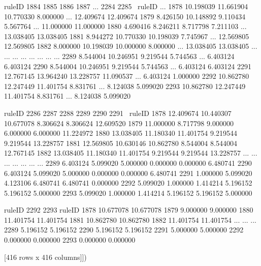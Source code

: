 ruleID       1884       1885       1886       1887  ...       2284       2285  \
ruleID                                              ...                         
1878    10.198039  11.661904  10.770330   8.000000  ...  12.409674  12.409674   
1879     8.426150  10.148892   9.110434   5.567764  ...  11.000000  11.000000   
1880     4.690416   8.246211   8.717798   7.211103  ...  13.038405  13.038405   
1881     8.944272  10.770330  10.198039   7.745967  ...  12.569805  12.569805   
1882     8.000000  10.198039  10.000000   8.000000  ...  13.038405  13.038405   
...           ...        ...        ...        ...  ...        ...        ...   
2289     8.544004  10.246951   9.219544   5.744563  ...   6.403124   6.403124   
2290     8.544004  10.246951   9.219544   5.744563  ...   6.403124   6.403124   
2291    12.767145  13.964240  13.228757  11.090537  ...   6.403124   1.000000   
2292    10.862780  12.247449  11.401754   8.831761  ...   8.124038   5.099020   
2293    10.862780  12.247449  11.401754   8.831761  ...   8.124038   5.099020   

ruleID       2286       2287       2288      2289      2290       2291  \
ruleID                                                                   
1878    12.409674  10.440307  10.677078  8.306624  8.306624  12.609520   
1879    11.000000   8.717798   9.000000  6.000000  6.000000  11.224972   
1880    13.038405  11.180340  11.401754  9.219544  9.219544  13.228757   
1881    12.569805  10.630146  10.862780  8.544004  8.544004  12.767145   
1882    13.038405  11.180340  11.401754  9.219544  9.219544  13.228757   
...           ...        ...        ...       ...       ...        ...   
2289     6.403124   5.099020   5.000000  0.000000  0.000000   6.480741   
2290     6.403124   5.099020   5.000000  0.000000  0.000000   6.480741   
2291     1.000000   5.099020   4.123106  6.480741  6.480741   0.000000   
2292     5.099020   1.000000   1.414214  5.196152  5.196152   5.000000   
2293     5.099020   1.000000   1.414214  5.196152  5.196152   5.000000   

ruleID       2292       2293  
ruleID                        
1878    10.677078  10.677078  
1879     9.000000   9.000000  
1880    11.401754  11.401754  
1881    10.862780  10.862780  
1882    11.401754  11.401754  
...           ...        ...  
2289     5.196152   5.196152  
2290     5.196152   5.196152  
2291     5.000000   5.000000  
2292     0.000000   0.000000  
2293     0.000000   0.000000  

[416 rows x 416 columns]])